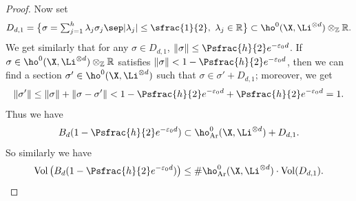 \begin{proof}[Proof]
Now set
\[\textstyle
D_{d,1}=\bigl\{ \sigma=\sum_{j=1}^{h}\lambda_j \sigma_j\sep |\lambda_j|\leq \sfrac{1}{2},\ \lambda_j\in \mathbb{R} \bigr\}\subset \ho^0(\X,\Li^{\otimes d})\otimes_{ \mathbb{Z}}\mathbb{R}.
\]
We get similarly that for any $\sigma\in D_{d,1}$, $\lVert \sigma\rVert \leq \Psfrac{h}{2}e^{-\varepsilon_0 d}$.
If $\sigma\in \ho^0(\X,\Li^{\otimes d})\otimes_{ \mathbb{Z}}\mathbb{R}$ satisfies $\lVert\sigma\rVert <1-\Psfrac{h}{2}e^{-\varepsilon_0 d}$, then we can find a section $\sigma'\in \ho^0(\X,\Li^{\otimes d})$ such that $\sigma\in \sigma'+D_{d, 1}$; moreover, we get
\[
\lVert \sigma' \rVert \leq \lVert \sigma \rVert + \lVert \sigma-\sigma' \rVert <1-\Psfrac{h}{2}e^{-\varepsilon_0 d}+\Psfrac{h}{2}e^{-\varepsilon_0 d}=1.
\]
Thus we have
\[
B_d(1-\Psfrac{h}{2}e^{-\varepsilon_0 d})\subset \ho^0_{\mathrm{Ar}}(\X,\Li^{\otimes d})+D_{d,1}.
\]
So similarly we have
\[
\mathrm{Vol} \left(B_d(1-\Psfrac{h}{2}e^{-\varepsilon_0 d}) \right)\leq \#\ho^0_{\mathrm{Ar}}(\X,\Li^{\otimes d})\cdot \mathrm{Vol}(D_{d,1}).
\]


\end{proof}
